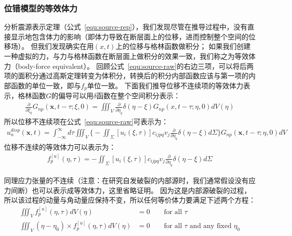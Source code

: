 \subsubsection{位错模型的等效体力}
分析震源表示定理（公式~\ref{equ:source-rep}），我们发现尽管在推导过程中，没有直接显示地包含体力的影响（即体力导致在断层面上的位移，进而控制整个空间的位移场）。
但我们发现确实在用$(x,t)$上的位移与格林函数做积分；
如果我们创建一种虚拟的力，与力与格林函数在断层面上做积分的效果一致，我们称之为等效体力（body-force equivalent）。
回顾公式~\ref{equ:source-raw}的右边三项，可以将后两项的面积分通过高斯定理转变为体积分，转换后的积分内部函数应该与第一项的内部函数的单位一致，即与$f_p$单位一致。
下面我们推导位移不连续项的等效体力表示，格林函数$G$的偏导可以用$\delta$函数在整个空间积分表示：
\begin{align}
    \frac{\partial}{\partial {\xi_q}} G_{n p}(\mathbf{x}, t-\tau ; \xi, 0) =
     \iiint\nolimits_{V} \frac{\partial}{\partial {\eta_q}} \delta(\eta-\xi) G_{np}(x,t-\tau;\eta ,0) dV(\eta ) 
   \label{equ:int_gf}
\end{align}
所以位移不连续项在公式~\ref{equ:source-raw}可表示为：
\begin{align}
    u_{n}^{disp}(\mathbf{x}, t)=
    \int\nolimits_{-\infty}^{\infty} d \tau \iiint\nolimits_{V} 
    \biggl\{ -\iint\nolimits_{\Sigma}  [u_{i}(\xi, \tau)] c_{i j p q} v_{j}  \frac{\partial}{\partial {\eta_q}} \delta(\eta-\xi) d\Sigma \biggl\}
        G_{n p}(\mathbf{x}, t-\tau ; \eta , 0) dV
    \label{equ:source_disp}
\end{align}
位移不连续的等效体力可以表示为：
\begin{align}
    f_p^{[u]}(\eta ,\tau) = 
    -\iint\nolimits_{\Sigma}  [u_{i}(\xi, \tau)] c_{i j p q} v_{j}  \frac{\partial}{\partial {\eta_q}} \delta(\eta-\xi) d\Sigma
    \label{equ:bf-equ}
\end{align}

同理应力张量的不连续（注意：在研究自发破裂的内部源时，我们通常假设没有应力间断）也可以表示成等效体力，这里省略证明。
因为这是内部源破裂的过程，所以该过程的动量与角动量应保持不变，所以任何等价体力要满足下述两个方程：
\begin{align}
    \iiint\nolimits_V  f_p^{[u]}(\eta ,\tau) dV(\eta ) & = 0  \qquad \text{for all } \tau \\
    \iiint\nolimits_V  (\eta-\eta_0) \times f_p^{[u]}(\eta ,\tau) dV(\eta ) & = 0  \qquad \text{for all } \tau \text{ and any fixed } \eta_0
\end{align}

